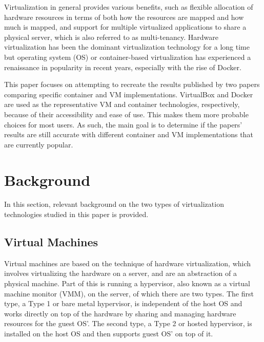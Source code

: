 \documentclass{sig-alternate-10pt}
\begin{document}
Virtualization in general provides various benefits, such as flexible allocation of hardware resources in terms of both how the resources are mapped and how much is mapped, and support for multiple virtualized applications to share a physical server, which is also referred to as multi-tenancy\cite{sharma:2016}. Hardware virtualization has been the dominant virtualization technology for a long time but operating system (OS) or container-based virtualization has experienced a renaissance in popularity in recent years, especially with the rise of Docker. 

This paper focuses on attempting to recreate the results published by two papers comparing specific container and VM implementations. VirtualBox and Docker are used as the representative VM and container technologies, respectively, because of their accessibility and ease of use. This makes them more probable choices for most users. As such, the main goal is to determine if the papers' results are still accurate with different container and VM implementations that are currently popular. 



\section{Background}
In this section, relevant background on the two types of virtualization technologies studied in this paper is provided.

\subsection{Virtual Machines}
Virtual machines are based on the technique of hardware virtualization, which involves virtualizing the hardware on a server, and are an abstraction of a physical machine\cite{sharma:2016}. Part of this is running a hypervisor, also known as a virtual machine monitor (VMM), on the server, of which there are two types. The first type, a Type 1 or bare metal hypervisor, is independent of the host OS and works directly on top of the hardware by sharing and managing hardware resources for the guest OS'. The second type, a Type 2 or hosted hypervisor, is installed on the host OS and then supports guest OS' on top of it. 
\end{document}
